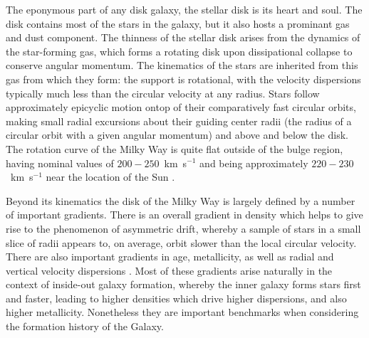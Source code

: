 The eponymous part of any disk galaxy, the stellar disk is its heart and soul. The disk contains most of the stars in the galaxy, but it also hosts a prominant gas and dust component. The thinness of the stellar disk arises from the dynamics of the star-forming gas, which forms a rotating disk upon dissipational collapse to conserve angular momentum. The kinematics of the stars are inherited from this gas from which they form: the support is rotational, with the velocity dispersions typically much less than the circular velocity at any radius. Stars follow approximately epicyclic motion ontop of their comparatively fast circular orbits, making small radial excursions about their guiding center radii (the radius of a circular orbit with a given angular momentum) and above and below the disk. The rotation curve of the Milky Way is quite flat outside of the bulge region, having nominal values of $200-250$~km~s$^{-1}$ and being approximately $220-230$~km~s$^{-1}$ near the location of the Sun \parencite[e.g.][]{bovy12a,eilers19}.

Beyond its kinematics the disk of the Milky Way is largely defined by a number of important gradients. There is an overall gradient in density \parencite[equivalently luminosity, as in other galaxies per e.g.][]{freeman70} which helps to give rise to the phenomenon of asymmetric drift, whereby a sample of stars in a small slice of radii appears to, on average, orbit slower than the local circular velocity. There are also important gradients in age, metallicity, as well as radial and vertical velocity dispersions \parencite[e.g.][]{bovy12d,bovy16b,mackereth19a}. Most of these gradients arise naturally in the context of inside-out galaxy formation, whereby the inner galaxy forms stars first and faster, leading to higher densities which drive higher dispersions, and also higher metallicity. Nonetheless they are important benchmarks when considering the formation history of the Galaxy.

